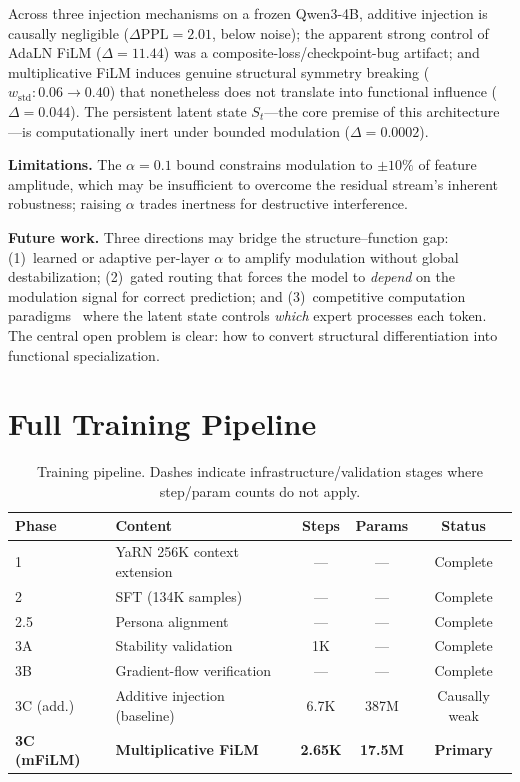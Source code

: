 \documentclass[11pt,a4paper]{article}
\newcommand{\St}{S_t}
\newcommand{\wstd}{w_{\mathrm{std}}}
\begin{document}
Across three injection mechanisms on a frozen Qwen3-4B, additive injection is causally
negligible ($\Delta\mathrm{PPL}=2.01$, below noise); the apparent strong control of
AdaLN FiLM ($\Delta=11.44$) was a composite-loss/checkpoint-bug artifact; and
multiplicative FiLM induces genuine structural symmetry breaking
($\wstd: 0.06\to0.40$) that nonetheless does not translate into functional influence
($\Delta=0.044$). The persistent latent state $\St$---the core premise of this
architecture---is computationally inert under bounded modulation ($\Delta=0.0002$).

\textbf{Limitations.} The $\alpha=0.1$ bound constrains modulation to $\pm10\%$ of
feature amplitude, which may be insufficient to overcome the residual stream's inherent
robustness; raising $\alpha$ trades inertness for destructive interference.

\textbf{Future work.} Three directions may bridge the structure--function gap:
(1)~learned or adaptive per-layer $\alpha$ to amplify modulation without global
destabilization; (2)~gated routing that forces the model to \emph{depend} on the
modulation signal for correct prediction; and (3)~competitive computation
paradigms~\cite{shazeer2017outrageously} where the latent state controls \emph{which}
expert processes each token. The central open problem is clear: how to convert
structural differentiation into functional specialization.

\appendix

\section{Full Training Pipeline}

\begin{table}[H]
\centering
\begin{tabular}{llccc}
\toprule
\textbf{Phase} & \textbf{Content} & \textbf{Steps} & \textbf{Params} & \textbf{Status} \\
\midrule
1   & YaRN 256K context extension & ---   & ---    & Complete \\
2   & SFT (134K samples)          & ---   & ---    & Complete \\
2.5 & Persona alignment           & ---   & ---    & Complete \\
3A  & Stability validation        & 1K    & ---    & Complete \\
3B  & Gradient-flow verification  & ---   & ---    & Complete \\
3C (add.) & Additive injection (baseline) & 6.7K & 387M & Causally weak \\
\textbf{3C (mFiLM)} & \textbf{Multiplicative FiLM} & \textbf{2.65K} & \textbf{17.5M} & \textbf{Primary} \\
\bottomrule
\end{tabular}
\caption{Training pipeline. Dashes indicate infrastructure/validation stages where
step/param counts do not apply.}
\end{table}
\end{document}

